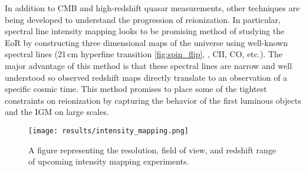 In addition to CMB and high-redshift quasar measurements, other techniques are being
developed to understand the progression of reionization. In particular, spectral line
intensity mapping looks to be promising method of studying the EoR by constructing
three dimensional maps of the universe using well-known spectral lines
(21\,cm hyperfine transition \ref{fig:spin_flip}, \lya, CII, CO, etc.). The major advantage
of this method is that these spectral lines are narrow and well understood so observed redshift
maps directly translate to an observation of a specific cosmic time. This
method promises to place some of the tightest constraints on reionization by capturing
the behavior of the first luminous objects and the IGM on large scales.

\begin{figure}[th]
	\centering
	\texttt{[image: results/intensity\_mapping.png]}
	\caption[Redshift and Resolution Coverage of Intensity Mapping Experiments]{A figure
					representing the resolution, field of view, and redshift range of upcoming intensity mapping
					experiments.}
	\label{fig:intensity_mapping}
\end{figure}
